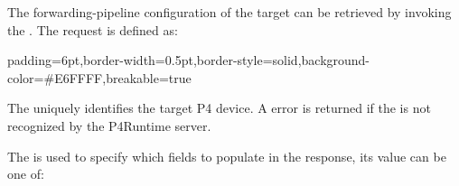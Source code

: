 \documentclass[11pt]{article}
\begin{document}
{%
\noindent{}The forwarding-pipeline configuration of the target can be retrieved by invoking
the . The request is defined as:%

\begin{mdbmargintb}{6pt}{6pt}%
\begin{mdblock}{padding=6pt,border-width=0.5pt,border-style=solid,background-color=\#E6FFFF,breakable=true}%
\begin{mdpre}%
\end{mdpre}%
\end{mdblock}%
\end{mdbmargintb}%

\noindent{}The  uniquely identifies the target P4 device. A  error is
returned if the  is not recognized by the P4Runtime server.%

The  is used to specify which fields to populate in the response,
its value can be one of:%

}
\end{document}
